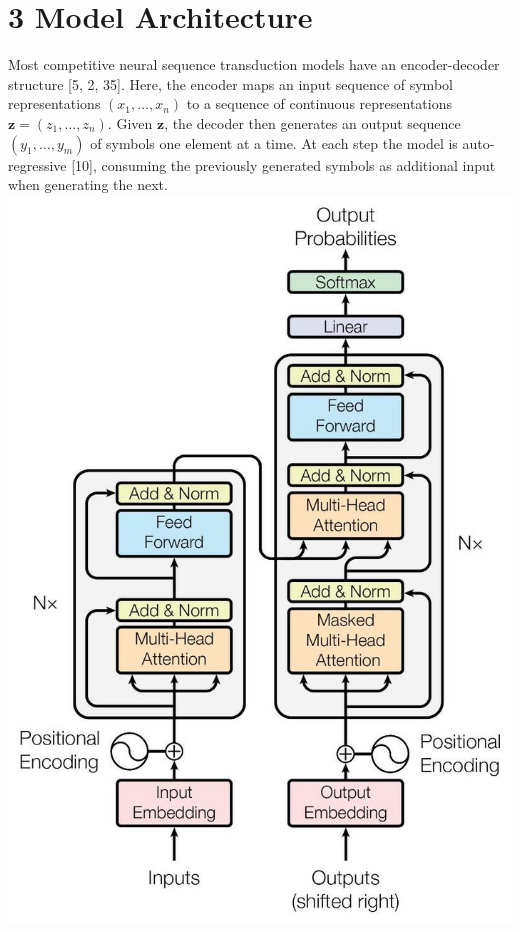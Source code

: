 \documentclass[10pt]{article}
\begin{document}
\section*{3 Model Architecture}
Most competitive neural sequence transduction models have an encoder-decoder structure [5, 2, 35]. Here, the encoder maps an input sequence of symbol representations $\left(x_{1}, \ldots, x_{n}\right)$ to a sequence of continuous representations $\mathbf{z}=\left(z_{1}, \ldots, z_{n}\right)$. Given $\mathbf{z}$, the decoder then generates an output sequence $\left(y_{1}, \ldots, y_{m}\right)$ of symbols one element at a time. At each step the model is auto-regressive [10], consuming the previously generated symbols as additional input when generating the next.\\
\includegraphics[max width=\textwidth, center]{2024_11_26_e9e27627ef2b75478aaag-03}
\end{document}

